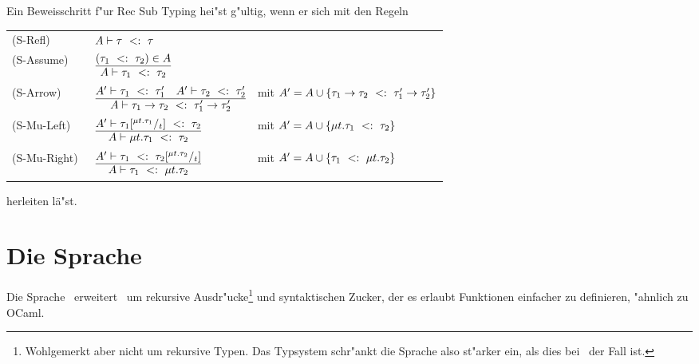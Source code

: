 Ein Beweisschritt f"ur Rec Sub Typing hei"st g"ultig, wenn er sich mit den Regeln  \\[5mm]
 \begin{tabular}{lll}
            \mbox{(S-Refl)\ } & $A \vdash \tau\ <:\ \tau$ \\[1mm]
            \mbox{(S-Assume)\ } & $\RULE{(\subtype{\tau_1} {\tau_2)} \in A}
                                   {A \vdash \subtype{\tau_1} {\tau_2}}$ \\[2mm]
            \mbox{(S-Arrow)\ } & $\RULE{A' \vdash \subtype{\tau_1} {\tau_1'}
                                   \quad
                                   A' \vdash \subtype{\tau_2} {\tau_2'}}
                                  {A \vdash \subtype{\typeArrow{\tau_1}{\tau_2}}
                                   {\typeArrow{\tau_1'}{\tau_2'}}}$ 
                                  & mit $A' = A \cup \{\tau_1\to\tau_2\ <:\ \tau_1'\to\tau_2'\}$ \\[2mm]
            \mbox{(S-Mu-Left)\ } & $\RULE{A' \vdash \subtype{\tau_1\SUB{\typeRec{t}{\tau_1}}{t}}
                                     {\tau_2}}
                                    {A \vdash \subtype{\typeRec{t}{\tau_1}} {\tau_2}}$
                                   & mit $A' = A \cup \{\mu t.\tau_1\ <:\ \tau_2\}$ \\[2mm]
            \mbox{(S-Mu-Right)\ } & $\RULE{A' \vdash \subtype{\tau_1}
                                     {\tau_2\SUB{\typeRec{t}{\tau_2}}{t}}}
                                    {A \vdash \subtype{\tau_1} {\typeRec{t}{\tau_2}}}$
                                   & mit $A' = A \cup \{\tau_1\ <:\ \mu t.\tau_2\}$ \\[2mm]
          \end{tabular}


herleiten l\"a"st.



\section{Die Sprache \LTWO}

Die Sprache \LTWO\ erweitert \LONE\ um rekursive Ausdr"ucke\footnote{Wohlgemerkt aber nicht um rekursive Typen. Das
Typsystem schr"ankt die Sprache also st"arker ein, als dies bei \LONE\ der Fall ist.} und syntaktischen Zucker, der
es erlaubt Funktionen einfacher zu definieren, "ahnlich zu OCaml.

